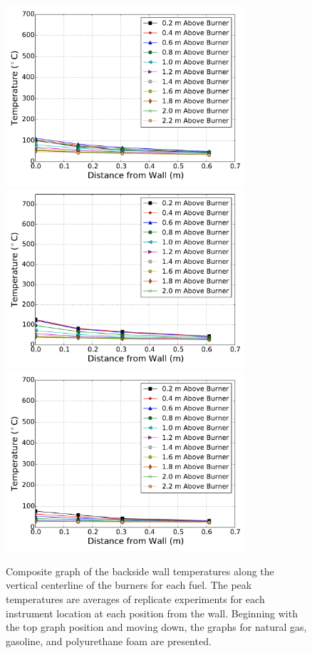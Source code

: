 \documentclass[twoside]{uocthesis}
\begin{document}
{\begin{figure}[p]
	\centering
	\includegraphics[width=3.5in]{../Figures/NCTW_NG_TC_Back_Center_Avg}\\
	\includegraphics[width=3.5in]{../Figures/NCTW_GAS_TC_Back_Center_Avg}\\
	\includegraphics[width=3.5in]{../Figures/NCTW_PUF_TC_Back_Center_Avg}\\
	\caption[Composite graph of the backside wall temperatures along the center of the burners]{Composite graph of the backside wall temperatures along the vertical centerline of the burners for each fuel. The peak temperatures are averages of replicate experiments for each instrument location at each position from the wall. Beginning with the top graph position and moving down, the graphs for natural gas, gasoline, and polyurethane foam are presented.}
	\label{NCTW_Back_Cent_comp}
\end{figure}


}
\end{document}
